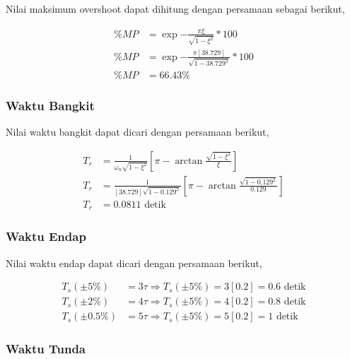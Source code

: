 \documentclass[../laporan]{subfiles}
\begin{document}
Nilai maksimum overshoot dapat dihitung dengan persamaan sebagai berikut,

\begin{equation}
    \begin{split}
        \%MP &= \exp{-\frac{\pi\xi}{\sqrt{1 - \xi^2}}}*100 \\[5pt]
        \%MP &= \exp{-\frac{\pi[38.729]}{\sqrt{1 - 38.729^2}}}*100 \\[5pt]
        \%MP &= 66.43 \%
    \end{split}
\end{equation}

\subsubsection{Waktu Bangkit}

Nilai waktu bangkit dapat dicari dengan persamaan berikut,

\begin{equation}
    \begin{split}
        T_r &= \frac{1}{\omega_n\sqrt{1-\xi^2}}[\pi-\arctan\frac{\sqrt{1-\xi^2}}{\xi}] \\[5pt]
        T_r &= \frac{1}{[38.729]\sqrt{1-0.129^2}}[\pi-\arctan\frac{\sqrt{1-0.129^2}}{0.129}] \\[5pt]
        T_r &= 0.0811 \text{ detik}
    \end{split}
\end{equation}

\subsubsection{Waktu Endap}

Nilai waktu endap dapat dicari dengan persamaan berikut,

\begin{equation}
    \begin{split}
        T_s(\pm5\%) &= 3\tau \Rightarrow T_s(\pm5\%) = 3[0.2] = 0.6 \text{ detik} \\[5pt]
        T_s(\pm2\%) &= 4\tau \Rightarrow T_s(\pm5\%) = 4[0.2] = 0.8 \text{ detik}\\[5pt]
        T_s(\pm0.5\%) &= 5\tau \Rightarrow T_s(\pm5\%) = 5[0.2] = 1 \text{ detik}
    \end{split}
\end{equation}

\subsubsection{Waktu Tunda}
\end{document}
